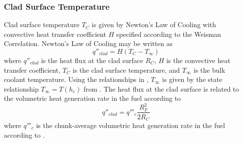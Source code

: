     \subsubsection{Clad Surface Temperature}
      Clad surface temperature $T_C$ is given by Newton's Law of Cooling with
      convective heat transfer coefficient $H$ specified according to the
      Weisman Correlation. Newton's Law of Cooling may be written as
      \begin{equation}
        q''_{clad} = H (T_C - T_{\infty})
      \end{equation}
      where $q''_{clad}$ is the heat flux at the clad surface $R_C$, $H$ is
      the convective heat transfer coefficient, $T_C$ is the clad surface
      temperature, and $T_{\infty}$ is the bulk coolant temperature. Using the
      relationships in , $T_{\infty}$ is given
      by the state relationship $T_{\infty} = T(h_c)$ from \cite{sodiumProp}.
      The heat flux at the clad surface is related to the volumetric heat 
      generation rate in the fuel according to 
      \begin{equation}
        q''_{clad} = q'''_c \frac{R_F^2}{2 R_C}
      \end{equation}
      where $q'''_c$ is the chunk-average volumetric heat generation rate in the
      fuel according to .

